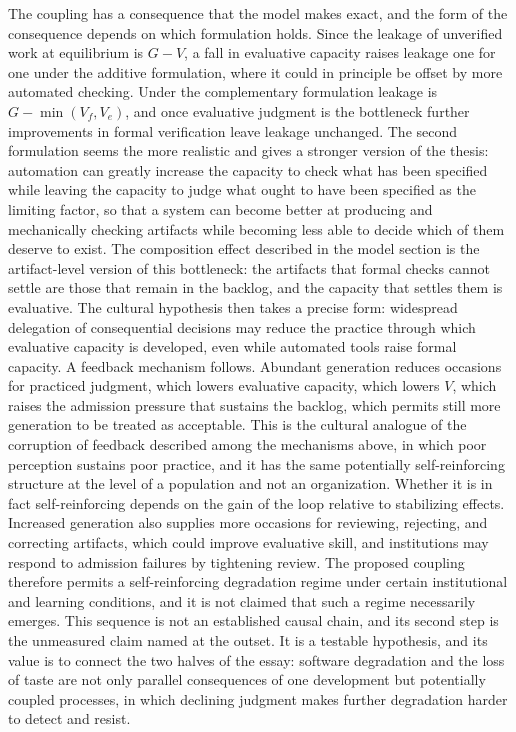 \documentclass[11pt,a4paper]{article}
\theoremstyle{remark}
\begin{document}
The coupling has a consequence that the model makes exact, and the form of the consequence depends on which formulation holds. Since the leakage of unverified work at equilibrium is $G-V$, a fall in evaluative capacity raises leakage one for one under the additive formulation, where it could in principle be offset by more automated checking. Under the complementary formulation leakage is $G-\min(V_f,V_e)$, and once evaluative judgment is the bottleneck further improvements in formal verification leave leakage unchanged. The second formulation seems the more realistic and gives a stronger version of the thesis: automation can greatly increase the capacity to check what has been specified while leaving the capacity to judge what ought to have been specified as the limiting factor, so that a system can become better at producing and mechanically checking artifacts while becoming less able to decide which of them deserve to exist. The composition effect described in the model section is the artifact-level version of this bottleneck: the artifacts that formal checks cannot settle are those that remain in the backlog, and the capacity that settles them is evaluative. The cultural hypothesis then takes a precise form: widespread delegation of consequential decisions may reduce the practice through which evaluative capacity is developed, even while automated tools raise formal capacity. A feedback mechanism follows. Abundant generation reduces occasions for practiced judgment, which lowers evaluative capacity, which lowers $V$, which raises the admission pressure that sustains the backlog, which permits still more generation to be treated as acceptable. This is the cultural analogue of the corruption of feedback described among the mechanisms above, in which poor perception sustains poor practice, and it has the same potentially self-reinforcing structure at the level of a population and not an organization. Whether it is in fact self-reinforcing depends on the gain of the loop relative to stabilizing effects. Increased generation also supplies more occasions for reviewing, rejecting, and correcting artifacts, which could improve evaluative skill, and institutions may respond to admission failures by tightening review. The proposed coupling therefore permits a self-reinforcing degradation regime under certain institutional and learning conditions, and it is not claimed that such a regime necessarily emerges. This sequence is not an established causal chain, and its second step is the unmeasured claim named at the outset. It is a testable hypothesis, and its value is to connect the two halves of the essay: software degradation and the loss of taste are not only parallel consequences of one development but potentially coupled processes, in which declining judgment makes further degradation harder to detect and resist.
\end{document}
